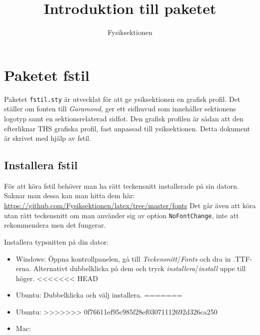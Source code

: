 \documentclass[a4paper]{article}
\title{Introduktion till paketet  \NoCaseChange{\texttt{fstil.sty}} }
\date{}
\author{Fysiksektionen}
\begin{document}
\ftitlepage
\ftoc
\section{Paketet fstil}
Paketet \texttt{fstil.sty} är utvecklat för att ge \F ysiksektionen en grafisk profil. Det ställer om fonten till \textit{Garamond}, ger ett sidhuvud som innehåller sektionens logotyp samt en sektionsrelaterad sidfot. Den grafisk profilen är sådan att den efterliknar THS grafiska profil, fast anpassad till \F ysiksektionen. Detta dokument är skrivet med hjälp av fstil.

\subsection{Installera fstil}
För att köra fstil behöver man ha rätt teckensnitt installerade på sin datorn. Saknar man dessa kan man hitta dem här: \href{https://github.com/Fysiksektionen/latex/tree/master/fonts}{https://github.com/Fysiksektionen/latex/tree/master/fonts}
Det går även att köra utan rätt teckensnitt om man använder sig av option \texttt{NoFontChange}, inte att rekommendera men det fungerar.

Installera typsnitten på din dator:
\begin{itemize}
\item[] Windows: Öppna kontrollpanelen, gå till \textit{Teckensnitt}/\textit{Fonts} och dra in .TTF-erna. Alternativt dubbelklicka på dem och tryck \textit{installera}/\textit{install} uppe till höger.
<<<<<<< HEAD
\item[] Ubuntu: Dubbelklicka och välj installera.
=======
\item[] Ubuntu:
>>>>>>> 0f76611ef95c985f28ef03071112692d326ca250
\item[] Mac:
\end{itemize}
\end{document}
